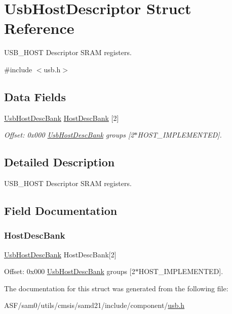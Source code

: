 \hypertarget{struct_usb_host_descriptor}{}\section{Usb\+Host\+Descriptor Struct Reference}
\label{struct_usb_host_descriptor}


U\+S\+B\+\_\+\+H\+O\+ST Descriptor S\+R\+AM registers.  




{\ttfamily \#include $<$usb.\+h$>$}

\subsection*{Data Fields}
\begin{DoxyCompactItemize}
\item 
\mbox{\hyperlink{struct_usb_host_desc_bank}{Usb\+Host\+Desc\+Bank}} \mbox{\hyperlink{struct_usb_host_descriptor_a86a097529079f0faab196788c64f4724}{Host\+Desc\+Bank}} \mbox{[}2\mbox{]}
\begin{DoxyCompactList}\small\item\em Offset\+: 0x000 \mbox{\hyperlink{struct_usb_host_desc_bank}{Usb\+Host\+Desc\+Bank}} groups \mbox{[}2$\ast$\+H\+O\+S\+T\+\_\+\+I\+M\+P\+L\+E\+M\+E\+N\+T\+ED\mbox{]}. \end{DoxyCompactList}\end{DoxyCompactItemize}


\subsection{Detailed Description}
U\+S\+B\+\_\+\+H\+O\+ST Descriptor S\+R\+AM registers. 

\subsection{Field Documentation}
\mbox{\label{struct_usb_host_descriptor_a86a097529079f0faab196788c64f4724}} 
\subsubsection{\texorpdfstring{HostDescBank}{HostDescBank}}
{\footnotesize\ttfamily \mbox{\hyperlink{struct_usb_host_desc_bank}{Usb\+Host\+Desc\+Bank}} Host\+Desc\+Bank\mbox{[}2\mbox{]}}



Offset\+: 0x000 \mbox{\hyperlink{struct_usb_host_desc_bank}{Usb\+Host\+Desc\+Bank}} groups \mbox{[}2$\ast$\+H\+O\+S\+T\+\_\+\+I\+M\+P\+L\+E\+M\+E\+N\+T\+ED\mbox{]}. 



The documentation for this struct was generated from the following file\+:\begin{DoxyCompactItemize}
\item 
A\+S\+F/sam0/utils/cmsis/samd21/include/component/\mbox{\hyperlink{component_2usb_8h}{usb.\+h}}\end{DoxyCompactItemize}
